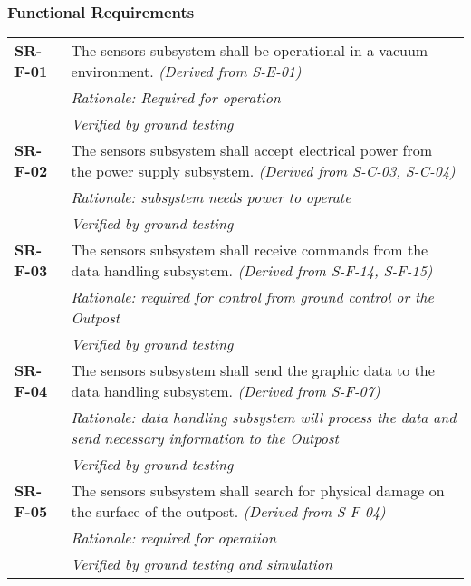\subsubsection*{Functional Requirements}
\vspace{-15pt}
\begin{longtable}{P{2cm}P{13.25cm}}
\textbf{SR-F-01}	&
The sensors subsystem shall be operational in a vacuum environment.
\textit{(Derived from S-E-01)}	\\
& \textit{Rationale: Required for operation}	\\
& \textit{Verified by ground testing}	\\

\textbf{SR-F-02}	& The sensors subsystem shall accept electrical power from the power supply subsystem. 
\textit{(Derived from S-C-03, S-C-04)}	\\
& \textit{Rationale: subsystem needs power to operate}	\\
& \textit{Verified by ground testing}	\\

\textbf{SR-F-03}	& The sensors subsystem shall receive commands from the data handling subsystem. \textit{(Derived from S-F-14, S-F-15)} \\
 & \textit{Rationale: required for control from ground control or the Outpost} \\
 & \textit{Verified by ground testing}	\\

\textbf{SR-F-04}	& The sensors subsystem shall send the graphic data to the data handling subsystem. \textit{(Derived from S-F-07)} \\
 & \textit{Rationale: data handling subsystem will process the data and send necessary information to the Outpost} \\
 & \textit{Verified by ground testing}		\\

\textbf{SR-F-05}	& The sensors subsystem shall search for physical damage on the surface of the outpost. \textit{(Derived from S-F-04)} \\
 & \textit{Rationale: required for operation} \\
 & \textit{Verified by ground testing and simulation}	
\end{longtable}
\vspace{-15pt}
